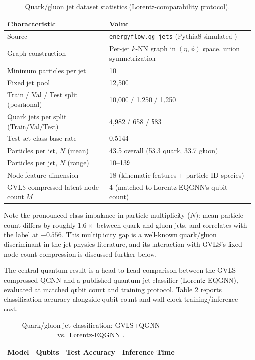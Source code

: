 \documentclass[11pt]{article}
\begin{document}
\begin{table}[h]
  \centering
  \caption{Quark/gluon jet dataset statistics (Lorentz-comparability protocol).}
  \label{tab:jet-dataset}
  \begin{tabular}{@{}ll@{}}
    \toprule
    \textbf{Characteristic} & \textbf{Value} \\
    \midrule
    Source & \texttt{energyflow.qg\_jets} \cite{komiske2019energyflow} (Pythia8-simulated \cite{sjostrand2008pythia}) \\
    Graph construction & Per-jet $k$-NN graph in $(\eta,\phi)$ space, union symmetrization \\
    Minimum particles per jet & 10 \\
    Fixed jet pool & 12{,}500 \\
    Train / Val / Test split (positional) & 10{,}000 / 1{,}250 / 1{,}250 \\
    Quark jets per split (Train/Val/Test) & 4{,}982 / 658 / 583 \\
    Test-set class base rate & 0.5144 \\
    Particles per jet, $N$ (mean) & 43.5 overall (53.3 quark, 33.7 gluon) \\
    Particles per jet, $N$ (range) & 10--139 \\
    Node feature dimension & 18 (kinematic features + particle-ID species) \\
    GVLS-compressed latent node count $M$ & 4 (matched to Lorentz-EQGNN's qubit count) \\
    \bottomrule
  \end{tabular}
\end{table}

Note the pronounced class imbalance in particle multiplicity ($N$): mean
particle count differs by roughly $1.6\times$ between quark and gluon jets,
and correlates with the label at $-0.556$. This multiplicity gap is a
well-known quark/gluon discriminant in the jet-physics literature, and its
interaction with GVLS's fixed-node-count compression is discussed further
below.

The central quantum result is a head-to-head comparison between the
GVLS-compressed QGNN and a published quantum jet classifier
(Lorentz-EQGNN), evaluated at matched qubit count and training protocol.
Table \ref{tab:qgnn-results} reports classification accuracy alongside
qubit count and wall-clock training/inference cost.

\begin{table}[h]
  \centering
  \caption{Quark/gluon jet classification: GVLS+QGNN vs.\ Lorentz-EQGNN \cite{lorentzeqgnn2024}.}
  \label{tab:qgnn-results}
  \begin{tabular}{lccc}
    \toprule
    Model & Qubits & Test Accuracy & Inference Time \\
    \midrule
    \bottomrule
  \end{tabular}
\end{table}
\end{document}

